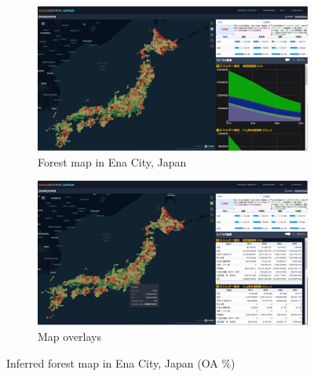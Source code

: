 \begin{figure}[tbh!]
  \centering
  \begin{subfigure}{.5\textwidth}
      \centering
      \includegraphics[width=.9\textwidth]{figs/chap7/drawdown1.png}
      \caption{Forest map in Ena City, Japan}
  \end{subfigure}%
  \begin{subfigure}{.5\textwidth}
      \centering
      \includegraphics[width=.9\textwidth]{figs/chap7/drawdown2.png}
      \caption{Map overlays}
  \end{subfigure}
  \caption[Inferred forest map in Ena City]{Inferred forest map in Ena City, Japan  (OA \%)}
  \label{fig:chap7_fig3}
\end{figure}

